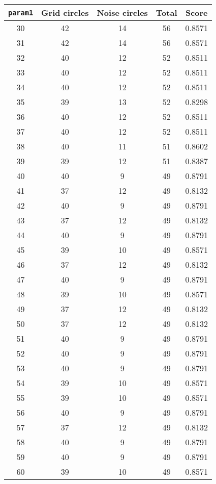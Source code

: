\documentclass[letterpaper, 12pt]{article}
\begin{document}
\begin{longtable}{|c|c|c|c|c|}
\hline
\textbf{\texttt{param1}} & \textbf{Grid circles} & \textbf{Noise circles} & \textbf{Total} & \textbf{Score} \\
\hline
30 & 42 & 14 & 56 & 0.8571 \\
\hline
31 & 42 & 14 & 56 & 0.8571 \\
\hline
32 & 40 & 12 & 52 & 0.8511 \\
\hline
33 & 40 & 12 & 52 & 0.8511 \\
\hline
34 & 40 & 12 & 52 & 0.8511 \\
\hline
35 & 39 & 13 & 52 & 0.8298 \\
\hline
36 & 40 & 12 & 52 & 0.8511 \\
\hline
37 & 40 & 12 & 52 & 0.8511 \\
\hline
38 & 40 & 11 & 51 & 0.8602 \\
\hline
39 & 39 & 12 & 51 & 0.8387 \\
\hline
40 & 40 & 9 & 49 & 0.8791 \\
\hline
41 & 37 & 12 & 49 & 0.8132 \\
\hline
42 & 40 & 9 & 49 & 0.8791 \\
\hline
43 & 37 & 12 & 49 & 0.8132 \\
\hline
44 & 40 & 9 & 49 & 0.8791 \\
\hline
45 & 39 & 10 & 49 & 0.8571 \\
\hline
46 & 37 & 12 & 49 & 0.8132 \\
\hline
47 & 40 & 9 & 49 & 0.8791 \\
\hline
48 & 39 & 10 & 49 & 0.8571 \\
\hline
49 & 37 & 12 & 49 & 0.8132 \\
\hline
50 & 37 & 12 & 49 & 0.8132 \\
\hline
51 & 40 & 9 & 49 & 0.8791 \\
\hline
52 & 40 & 9 & 49 & 0.8791 \\
\hline
53 & 40 & 9 & 49 & 0.8791 \\
\hline
54 & 39 & 10 & 49 & 0.8571 \\
\hline
55 & 39 & 10 & 49 & 0.8571 \\
\hline
56 & 40 & 9 & 49 & 0.8791 \\
\hline
57 & 37 & 12 & 49 & 0.8132 \\
\hline
58 & 40 & 9 & 49 & 0.8791 \\
\hline
59 & 40 & 9 & 49 & 0.8791 \\
\hline
60 & 39 & 10 & 49 & 0.8571 \\

\end{longtable}
\end{document}
